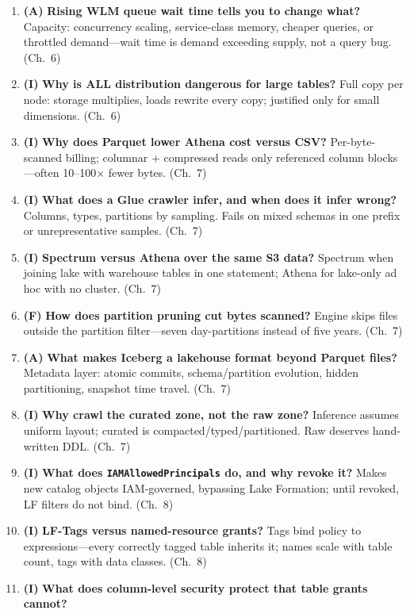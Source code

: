 \begin{enumerate}
    \item \textbf{(A)} \textbf{Rising WLM queue wait time tells you to change what?}
    Capacity: concurrency scaling, service-class memory, cheaper queries, or throttled
    demand---wait time is demand exceeding supply, not a query bug. (Ch.~6)
    \item \textbf{(I)} \textbf{Why is ALL distribution dangerous for large tables?}
    Full copy per node: storage multiplies, loads rewrite every copy; justified only for small
    dimensions. (Ch.~6)
    \item \textbf{(I)} \textbf{Why does Parquet lower Athena cost versus CSV?}
    Per-byte-scanned billing; columnar + compressed reads only referenced column blocks---often
    10--100$\times$ fewer bytes. (Ch.~7)
    \item \textbf{(I)} \textbf{What does a Glue crawler infer, and when does it infer wrong?}
    Columns, types, partitions by sampling. Fails on mixed schemas in one prefix or
    unrepresentative samples. (Ch.~7)
    \item \textbf{(I)} \textbf{Spectrum versus Athena over the same S3 data?}
    Spectrum when joining lake with warehouse tables in one statement; Athena for lake-only ad hoc
    with no cluster. (Ch.~7)
    \item \textbf{(F)} \textbf{How does partition pruning cut bytes scanned?}
    Engine skips files outside the partition filter---seven day-partitions instead of five years.
    (Ch.~7)
    \item \textbf{(A)} \textbf{What makes Iceberg a lakehouse format beyond Parquet files?}
    Metadata layer: atomic commits, schema/partition evolution, hidden partitioning, snapshot time
    travel. (Ch.~7)
    \item \textbf{(I)} \textbf{Why crawl the curated zone, not the raw zone?}
    Inference assumes uniform layout; curated is compacted/typed/partitioned. Raw deserves
    hand-written DDL. (Ch.~7)
    \item \textbf{(I)} \textbf{What does \texttt{IAMAllowedPrincipals} do, and why revoke it?}
    Makes new catalog objects IAM-governed, bypassing Lake Formation; until revoked, LF filters do
    not bind. (Ch.~8)
    \item \textbf{(I)} \textbf{LF-Tags versus named-resource grants?}
    Tags bind policy to expressions---every correctly tagged table inherits it; names scale with
    table count, tags with data classes. (Ch.~8)
    \item \textbf{(I)} \textbf{What does column-level security protect that table grants cannot?}

\end{enumerate}

